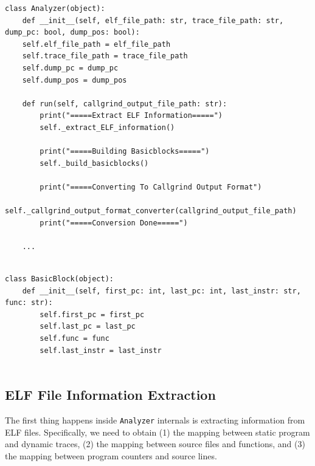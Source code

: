 \medskip
\begin{center}
\begin{minipage}{\textwidth}
\begin{lstlisting}
class Analyzer(object):
    def __init__(self, elf_file_path: str, trace_file_path: str, dump_pc: bool, dump_pos: bool):
    self.elf_file_path = elf_file_path
    self.trace_file_path = trace_file_path
    self.dump_pc = dump_pc
    self.dump_pos = dump_pos

    def run(self, callgrind_output_file_path: str):
        print("=====Extract ELF Information=====")
        self._extract_ELF_information()
        
        print("=====Building Basicblocks=====")
        self._build_basicblocks()

        print("=====Converting To Callgrind Output Format")
        self._callgrind_output_format_converter(callgrind_output_file_path)
        print("=====Conversion Done=====")

    ...
    
\end{lstlisting}
\end{minipage}
\end{center} 

\medskip
\begin{center}
\begin{minipage}{\textwidth}
\begin{lstlisting}
class BasicBlock(object):
    def __init__(self, first_pc: int, last_pc: int, last_instr: str, func: str):
        self.first_pc = first_pc
        self.last_pc = last_pc
        self.func = func
        self.last_instr = last_instr
    
\end{lstlisting}
\end{minipage}
\end{center}




\subsection{ELF File Information Extraction} 
\label{sec:elf_info_extraction}

The first thing happens inside \texttt{Analyzer} internals is extracting information from ELF files. Specifically, we need to obtain (1) the mapping between static program and dynamic traces, (2) the mapping between source files and functions, and (3) the mapping between program counters and source lines.

